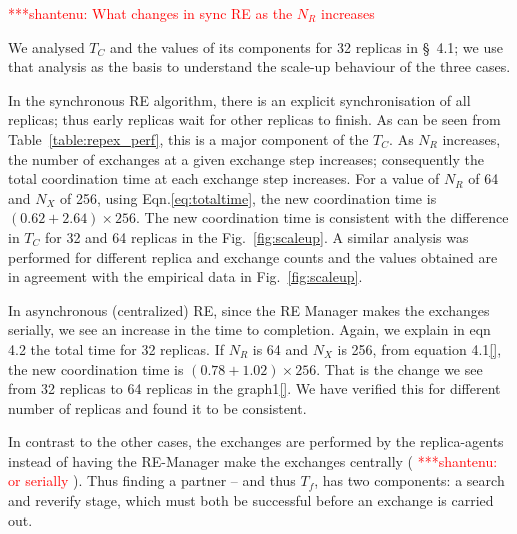 \documentclass{rspublic}
\newcommand{\jhanote}[1]{ {\textcolor{red} { ***shantenu: #1 }}}
\newcommand{\jhanote}[1]{}
\begin{document}
\jhanote{What changes in sync RE as the $N_R$ increases} 

We analysed $T_C$ and the values of its components for 32 replicas in
\S~4.1; we use that analysis as the basis to understand the 
scale-up behaviour of the three cases.
 
In the synchronous RE algorithm, there is an explicit synchronisation
of all replicas; thus early replicas wait for other replicas to
finish. As can be seen from Table~\ref{table:repex_perf}, this is a
major component of the $T_C$.  As $N_R$ increases, the number of
exchanges at a given exchange step increases; consequently the total
coordination time at each exchange step increases.  For a value of
$N_R$ of 64 and $N_X$ of 256, using Eqn.\ref{eq:totaltime}, the new
coordination time is $(0.62+2.64) \times 256$.  The new coordination
time is consistent with the difference in $T_C$ for 32 and 64 replicas
in the Fig.~\ref{fig:scaleup}. A similar analysis was performed for
different replica and exchange counts and the values obtained are in
agreement with the empirical data in Fig.~\ref{fig:scaleup}.


In asynchronous (centralized) RE, since the RE Manager makes the
exchanges serially, we see an increase in the time to
completion. Again, we explain in eqn 4.2 the total time for 32
replicas.  If $N_R$ is 64 and $N_X$ is 256, from equation 4.1\ref{},
the new coordination time is $(0.78+1.02) \times 256$. That is the
change we see from 32 replicas to 64 replicas in the graph1\ref{}. We
have verified this for different number of replicas and found it to be
consistent.


In contrast to the other cases, the exchanges are performed by the
replica-agents instead of having the RE-Manager make the exchanges
centrally (\jhanote{or serially}).  Thus finding a partner -- and thus
$T_f$, has two components: a search and reverify stage, which must
both be successful before an exchange is carried out.
\end{document}
